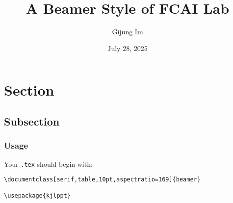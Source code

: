 \documentclass[serif,table,10pt,aspectratio=169]{beamer} %
\title{\large
A Beamer Style of FCAI Lab
}
\date[August, 2025]{July 28, 2025}
\author[G.~Im]{Gijung Im}
\institute{FCAI Lab \\Yonsei University}
\begin{document}
\frame{\titlepage}

\section{Section}

\subsection{Subsection}

\begin{frame}[fragile]
\frametitle{Usage}

Your \texttt{.tex} should begin with:
\begin{lstlisting}
\documentclass[serif,table,10pt,aspectratio=169]{beamer}

\usepackage{kjlppt}
\end{lstlisting}

\end{frame}
\end{document}
